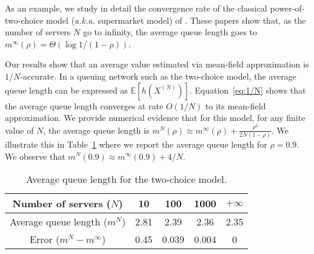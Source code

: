 \documentclass[sigconf]{acmart}
\newcommand\XN{X^{(N)}}
\newcommand\esp[1]{{\mathchoice{\besp{#1}}{\sesp{#1}}{\sesp{#1}}{\sesp{#1}}}}
\newcommand\besp[1]{\mathbb{E}\left[#1\right]}
\newcommand\sesp[1]{\mathbb{E}[#1]}
\newcommand\p[1]{\left(#1\right)}
\newcommand\githublink{\url{https://github.com/ngast/meanFieldAccuracy}}
\begin{document}
As an example, we study in detail the convergence rate of the
classical power-of-two-choice model (\emph{a.k.a.} supermarket model)
of \cite{mitzenmacher1996power,vvedenskaya1996queueing}. These papers
show that, as the number of servers $N$ go to infinity, the average
queue length goes to $m^{\infty}(\rho)=\Theta(\log 1/(1-\rho))$.%


Our results show that an average value estimated via mean-field
approximation is $1/N$-accurate.  In a queuing network such as the
two-choice model, the average queue length can be expressed as
$\sesp{h(\XN)}$.  Equation~\eqref{eq:1/N} shows that the average queue
length converges at rate $O(1/N)$ to its mean-field approximation.  We
provide numerical evidence that for this model, for any finite value
of $N$, the average queue length is
$ m^N(\rho) \approx m^{\infty}(\rho)+\frac{\rho^2}{2N(1-\rho)}$. We
illustrate this in Table~\ref{tab:power2} where we report the average
queue length for $\rho=0.9$. We observe that
$m^{N}(0.9)\approx m^{\infty}(0.9)+4/N$.

\begin{table}[ht]
  \centering
  \begin{tabular}{|c|c|c|c|c|}
    \hline
    Number of servers ($N$) & 10 & 100 & 1000 &$+\infty$\\\hline
    Average queue length ($m^N$) &2.81&2.39&2.36& 2.35\\\hline
    Error ($m^N-m^\infty$) & 0.45 & 0.039 & 0.004 & 0 \\\hline
  \end{tabular}
  \caption{Average queue length for the two-choice model. %
  }
  \label{tab:power2}
\end{table}






\end{document}
